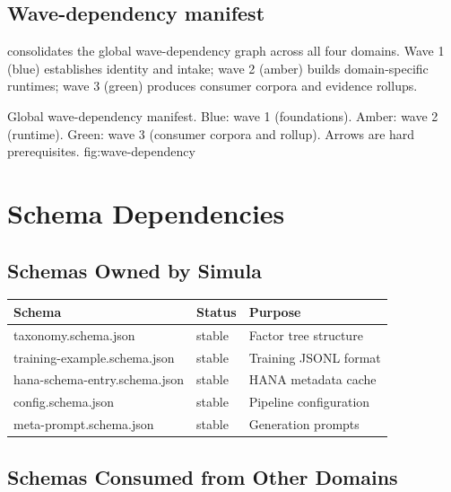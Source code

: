 \subsection{Wave-dependency manifest}
\label{sec:wave-dependency}

 consolidates the global wave-dependency graph
across all four domains. Wave 1 (blue) establishes identity and intake; wave 2
(amber) builds domain-specific runtimes; wave 3 (green) produces consumer
corpora and evidence rollups.

%
  {Global wave-dependency manifest. Blue: wave 1 (foundations). Amber: wave 2
    (runtime). Green: wave 3 (consumer corpora and rollup). Arrows are hard
    prerequisites.}%
  {fig:wave-dependency}

\section{Schema Dependencies}
\label{sec:schema-deps}

\subsection{Schemas Owned by Simula}

\begin{tabularx}{\linewidth}{@{}l l X@{}}
\toprule
\textbf{Schema} & \textbf{Status} & \textbf{Purpose} \\
\midrule
taxonomy.schema.json & stable & Factor tree structure \\
training-example.schema.json & stable & Training JSONL format \\
hana-schema-entry.schema.json & stable & HANA metadata cache \\
config.schema.json & stable & Pipeline configuration \\
meta-prompt.schema.json & stable & Generation prompts \\
\bottomrule
\end{tabularx}

\subsection{Schemas Consumed from Other Domains}

